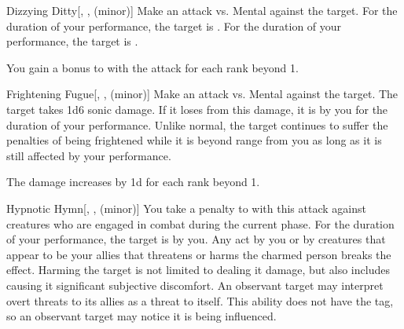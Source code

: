 {            \begin{freeability}{Dizzying Ditty}[, ,  (minor)]
                Make an attack vs. Mental against the target.
                \hit For the duration of your performance, the target is .
                \crit For the duration of your performance, the target is .

                \rankline
                You gain a  bonus to  with the attack for each rank beyond 1.
            \end{freeability}

            \begin{freeability}{Frightening Fugue}[, ,  (minor)]
                Make an attack vs. Mental against the target.
                \hit The target takes 1d6 sonic damage.
                If it loses  from this damage, it is  by you for the duration of your performance.
                Unlike normal, the target continues to suffer the penalties of being frightened while it is beyond \rngmed range from you as long as it is still affected by your performance.

                \rankline
                The damage increases by \plus1d for each rank beyond 1.
            \end{freeability}

            \begin{freeability}{Hypnotic Hymn}[, ,  (minor)]
                You take a  penalty to  with this attack against creatures who are engaged in combat during the current phase.
                \hit For the duration of your performance, the target is  by you.
                Any act by you or by creatures that appear to be your allies that threatens or harms the charmed person breaks the effect.
                Harming the target is not limited to dealing it damage, but also includes causing it significant subjective discomfort.
                An observant target may interpret overt threats to its allies as a threat to itself.
                This ability does not have the  tag, so an observant target may notice it is being influenced.


\end{freeability}}
